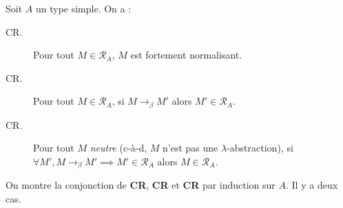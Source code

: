 \documentclass[./main]{subfiles}
\begin{document}
  \begin{prop}
    Soit $A$ un type simple.
    On a :
    \begin{description}
      \item[CR.] Pour tout $M \in \mathcal{R}_A$, $M$ est fortement normalisant.
      \item[CR.] Pour tout $M \in \mathcal{R}_A$, si $M \to_\beta M'$ alors $M' \in \mathcal{R}_A$.
      \item[CR.] Pour tout $M$ \textit{neutre} (c-à-d, $M$ n'est pas une $\lambda$-abstraction), si $\forall M', M \to_\beta M' \implies M' \in \mathcal{R}_A$ alors $M \in \mathcal{R}_A$.
    \end{description}
  \end{prop}
  \begin{prv}
    On montre la conjonction de \textbf{\textsf{CR}}, \textbf{\textsf{CR}} et \textbf{\textsf{CR}} par induction sur $A$.
    Il y a deux cas.


\end{prv}
\end{document}
